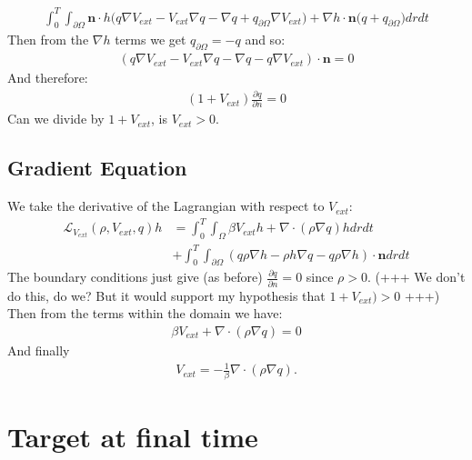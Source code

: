 \documentclass[11pt, a4paper]{article}
\theoremstyle{definition}
\newcommand{\n}{\mathbf{n}}
\begin{document}
	\begin{align*}
		\int_0^T \int_{\partial \Omega} \n \cdot h \bigg(q  \nabla V_{ext} -  V_{ext} \nabla q -\nabla q + q_{\partial \Omega} \nabla V_{ext} \bigg) +
		\nabla h \cdot \n \bigg(q  + q_{\partial \Omega}  \bigg)dr dt
	\end{align*}
Then from the $\nabla h$ terms we get $q_{\partial \Omega} = - q$ and so:
\begin{align*}
	(q  \nabla V_{ext} -  V_{ext} \nabla q -\nabla q - q \nabla V_{ext}  ) \cdot \n = 0
\end{align*}
	And therefore:
	\begin{align*}
		(1 + V_{ext})\frac{\partial q}{\partial n} = 0
	\end{align*}
Can we divide by $1 + V_{ext}$, is $V_{ext} > 0$.
	\subsection{Gradient Equation}
	We take the derivative of the Lagrangian with respect to $V_{ext}$:
	\begin{align*}
		\mathcal{L}_{V_{ext}} (\rho, V_{ext},q)h &= \int_0^T \int_\Omega \beta V_{ext} h + \nabla \cdot (\rho \nabla q) h dr dt \\
		&+\int_0^T \int_{\partial \Omega} (q \rho \nabla h - \rho h \nabla q - q \rho \nabla h) \cdot \n dr dt
	\end{align*}
	The boundary conditions just give (as before) $\frac{\partial q}{\partial n} = 0$ since $\rho >0$. (+++ We don't do this, do we? But it would support my hypothesis that $1 + V_{ext}) >0$ +++)
	Then from the terms within the domain we have:
	\begin{align*}
		\beta V_{ext}  + \nabla \cdot (\rho \nabla q)  = 0
	\end{align*}
	And finally 
	\begin{align*}
		V_{ext} = - \frac{1}{\beta} \nabla \cdot (\rho \nabla q).
	\end{align*}
	
	
	\section{Target at final time}
	
\end{document}
